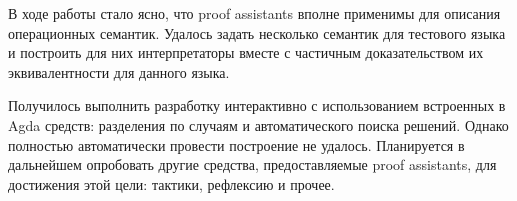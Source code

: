 \documentclass[aps,12pt,final,oneside,onecolumn,musixtex,superscriptaddress,centertags]{article}
\begin{document}
  В ходе работы стало ясно, что proof assistants вполне применимы для описания операционных семантик. Удалось задать несколько семантик для тестового языка и построить для них интерпретаторы вместе с частичным доказательством их эквивалентности для данного языка.

  Получилось выполнить разработку интерактивно с использованием встроенных в Agda средств: разделения по случаям и автоматического поиска решений. Однако полностью автоматически провести построение не удалось. Планируется в дальнейшем опробовать другие средства, предоставляемые proof assistants, для достижения этой цели: тактики, рефлексию и прочее.

  \newpage
  
  
\end{document}
